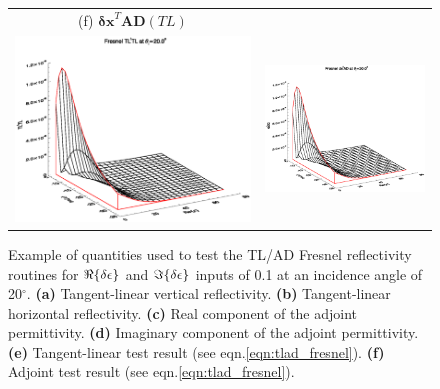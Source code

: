 \begin{figure}[htp]
\begin{tabular}{c c}
    \textsf{(f)} $\mathbf{\delta x}^{T}\mathbf{AD}(TL)$ \\
    \includegraphics[bb=110 240 508 540,clip,scale=0.5]{graphics/Fresnel/TLAD/TLtTL_z20.0.eps} & 
    \includegraphics[bb=110 240 508 540,clip,scale=0.5]{graphics/Fresnel/TLAD/dxtAD_z20.0.eps}
  \end{tabular}
  \caption{Example of quantities used to test the TL/AD Fresnel reflectivity routines for $\Re\{\delta\epsilon\}$ and $\Im\{\delta\epsilon\}$ inputs of 0.1 at an incidence angle of 20$^{\circ}$. \textbf{(a)} Tangent-linear vertical reflectivity. \textbf{(b)} Tangent-linear horizontal reflectivity. \textbf{(c)} Real component of the adjoint permittivity.  \textbf{(d)} Imaginary component of the adjoint permittivity. \textbf{(e)} Tangent-linear test result (see eqn.\ref{eqn:tlad_fresnel}). \textbf{(f)} Adjoint test result (see eqn.\ref{eqn:tlad_fresnel}).}
  \label{fig:tlad_z20.0_fresnel}
\end{figure}

